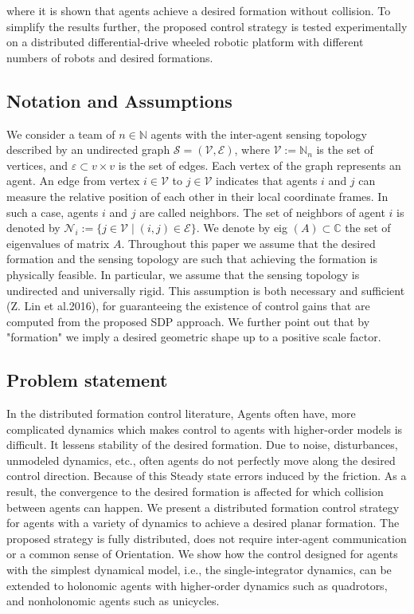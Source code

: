 \documentclass[10pt]{article}
\begin{document}
where it is shown that agents achieve a desired formation without collision. To simplify the results further, the proposed control strategy is tested experimentally on a distributed differential-drive wheeled robotic platform with different numbers of robots and desired formations.

\subsection{Notation and Assumptions}
We consider a team of $n \in \mathbb{N}$ agents with the inter-agent sensing topology described by an undirected graph $\mathcal{S}=(\mathcal{V}, \mathcal{E})$, where $\mathcal{V}:=\mathbb{N}_{n}$ is the set of vertices, and $\varepsilon \subset v \times v$ is the set of edges. Each vertex of the graph represents an agent. An edge from vertex $i \in \mathcal{V}$ to $j \in \mathcal{V}$ indicates that agents $i$ and $j$ can measure the relative position of each other in their local coordinate frames. In such a case, agents $i$ and $j$ are called neighbors. The set of neighbors of agent $i$ is denoted by $\mathcal{N}_{i}:=\{j \in \mathcal{V} \mid(i, j) \in \mathcal{E}\}$. We denote by eig $(A) \subset \mathbb{C}$ the set of eigenvalues of matrix $A$. Throughout this paper we assume that the desired formation and the sensing topology are such that achieving the formation is physically feasible. In particular, we assume that the sensing topology is undirected and universally rigid. This assumption is both necessary and sufficient (Z. Lin et al.2016), for guaranteeing the existence of control gains that are computed from the proposed SDP approach. We further point out that by "formation" we imply a desired geometric shape up to a positive scale factor.

\subsection{Problem statement}
In the distributed formation control literature, Agents often have, more complicated dynamics which makes control to agents with higher-order models is difficult. It lessens stability of the desired formation. Due to noise, disturbances, unmodeled dynamics, etc., often agents do not perfectly move along the desired control direction. Because of this Steady state errors induced by the friction. As a result, the convergence to the desired formation is affected for which collision between agents can happen. We present a distributed formation control strategy for agents with a variety of dynamics to achieve a desired planar formation. The proposed strategy is fully distributed, does not require inter-agent communication or a common sense of Orientation. We show how the control designed for agents with the simplest dynamical model, i.e., the single-integrator dynamics, can be extended to holonomic agents with higher-order dynamics such as quadrotors, and nonholonomic agents such as unicycles.
\end{document}
